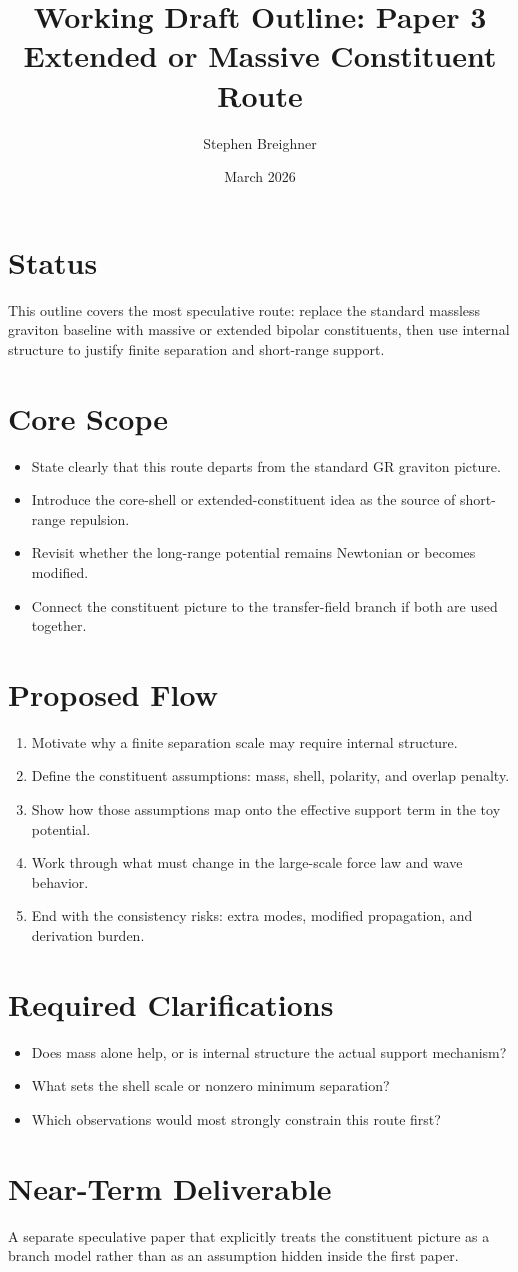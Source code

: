 \documentclass[11pt]{article}
\title{\textbf{Working Draft Outline: Paper 3 \\ Extended or Massive Constituent Route}}
\author{Stephen Breighner}
\date{March 2026}
\begin{document}
\maketitle

\section*{Status}
This outline covers the most speculative route: replace the standard massless graviton baseline with massive or extended bipolar constituents, then use internal structure to justify finite separation and short-range support.

\section*{Core Scope}
\begin{itemize}[leftmargin=1.25em]
  \item State clearly that this route departs from the standard GR graviton picture.
  \item Introduce the core-shell or extended-constituent idea as the source of short-range repulsion.
  \item Revisit whether the long-range potential remains Newtonian or becomes modified.
  \item Connect the constituent picture to the transfer-field branch if both are used together.
\end{itemize}

\section*{Proposed Flow}
\begin{enumerate}[leftmargin=1.4em]
  \item Motivate why a finite separation scale may require internal structure.
  \item Define the constituent assumptions: mass, shell, polarity, and overlap penalty.
  \item Show how those assumptions map onto the effective support term in the toy potential.
  \item Work through what must change in the large-scale force law and wave behavior.
  \item End with the consistency risks: extra modes, modified propagation, and derivation burden.
\end{enumerate}

\section*{Required Clarifications}
\begin{itemize}[leftmargin=1.25em]
  \item Does mass alone help, or is internal structure the actual support mechanism?
  \item What sets the shell scale or nonzero minimum separation?
  \item Which observations would most strongly constrain this route first?
\end{itemize}

\section*{Near-Term Deliverable}
A separate speculative paper that explicitly treats the constituent picture as a branch model rather than as an assumption hidden inside the first paper.
\end{document}
